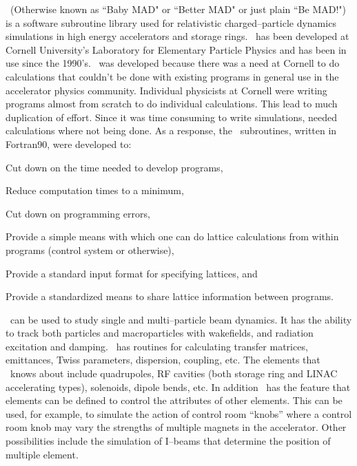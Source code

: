 
\bmad\ (Otherwise known as ``Baby MAD" or ``Better MAD" or just plain
``Be MAD!")  is a software subroutine library used for relativistic
charged--particle dynamics simulations in high energy accelerators and
storage rings. \bmad\ has been developed at Cornell University's
Laboratory for Elementary Particle Physics and has been in use since
the 1990's. \bmad\ was developed because there was a need at Cornell
to do calculations that couldn't be done with existing programs in
general use in the accelerator physics community. Individual
physicists at Cornell were writing programs almost from scratch to do
individual calculations. This lead to much duplication of effort.
Since it was time consuming to write simulations, needed calculations
where not being done. As a response, the \bmad\ subroutines, written in
Fortran90, were developed to:
\begin{Itemize}
\item Cut down on the time needed to develop programs,
\item Reduce computation times to a minimum,
\item Cut down on programming errors, 
\item Provide a simple means with which one can do lattice calculations 
from within programs (control system or otherwise),
\item Provide a standard input format for specifying lattices, and
\item Provide a standardized means to share lattice information between 
programs.
\end{Itemize}

\bmad\ can be used to study single and multi--particle beam dynamics.
It has the ability to track both particles and macroparticles with
wakefields, and radiation excitation and damping. \bmad\ has routines for
calculating transfer matrices, emittances, Twiss parameters, dispersion,
coupling, etc. The elements that \bmad\ knows about include
quadrupoles, RF cavities (both storage ring and LINAC accelerating
types), solenoids, dipole bends, etc. In addition \bmad\ has the feature
that elements can be defined to control the attributes of other
elements. This can be used, for example, to simulate the action of
control room ``knobs'' where a control room knob may vary the strengths
of multiple magnets in the accelerator. Other possibilities include
the simulation of I--beams that determine the position of multiple
element.

\vfill
\break
